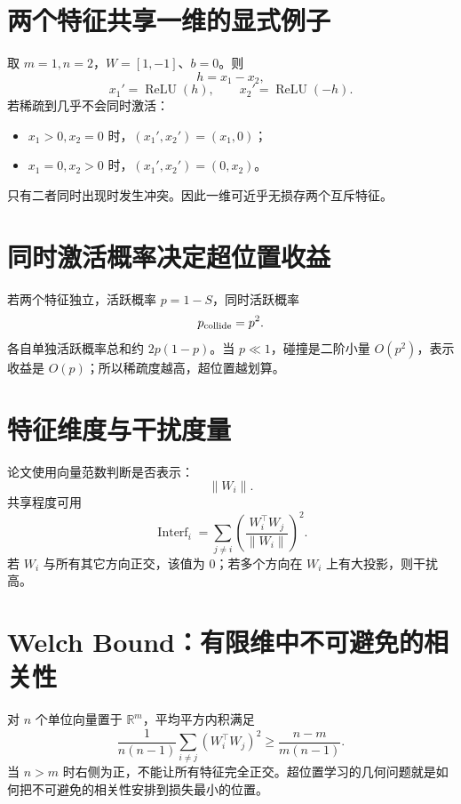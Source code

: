 \documentclass[UTF8,12pt,a4paper,fontset=none]{ctexart}
\numberwithin{equation}{section}
\newcommand{\R}{\mathbb{R}}
\newcommand{\norm}[1]{\left\lVert #1\right\rVert}
\begin{document}
\section{两个特征共享一维的显式例子}
取 $m=1,n=2$，$W=[1,-1]$、$b=0$。则
\begin{equation}
 h=x_1-x_2,
\end{equation}
\begin{equation}
 x_1'=\operatorname{ReLU}(h),
 \qquad x_2'=\operatorname{ReLU}(-h).
\end{equation}
若稀疏到几乎不会同时激活：
\begin{itemize}
 \item $x_1>0,x_2=0$ 时，$(x_1',x_2')=(x_1,0)$；
 \item $x_1=0,x_2>0$ 时，$(x_1',x_2')=(0,x_2)$。
\end{itemize}
只有二者同时出现时发生冲突。因此一维可近乎无损存两个互斥特征。

\section{同时激活概率决定超位置收益}
若两个特征独立，活跃概率 $p=1-S$，同时活跃概率
\begin{equation}
 p_{\rm collide}=p^2.
\end{equation}
各自单独活跃概率总和约 $2p(1-p)$。当 $p\ll1$，碰撞是二阶小量 $O(p^2)$，表示收益是 $O(p)$；所以稀疏度越高，超位置越划算。

\section{特征维度与干扰度量}
论文使用向量范数判断是否表示：
\begin{equation}
 \norm{W_i}.
\end{equation}
共享程度可用
\begin{equation}
 \operatorname{Interf}_i=
 \sum_{j\ne i}\left(\frac{W_i^\top W_j}{\norm{W_i}}
\right)^2.
\end{equation}
若 $W_i$ 与所有其它方向正交，该值为 0；若多个方向在 $W_i$ 上有大投影，则干扰高。

\section{Welch Bound：有限维中不可避免的相关性}
对 $n$ 个单位向量置于 $\R^m$，平均平方内积满足
\begin{equation}
 \frac{1}{n(n-1)}\sum_{i\ne j}(W_i^\top W_j)^2
 \ge\frac{n-m}{m(n-1)}.
\end{equation}
当 $n>m$ 时右侧为正，不能让所有特征完全正交。超位置学习的几何问题就是如何把不可避免的相关性安排到损失最小的位置。
\end{document}

